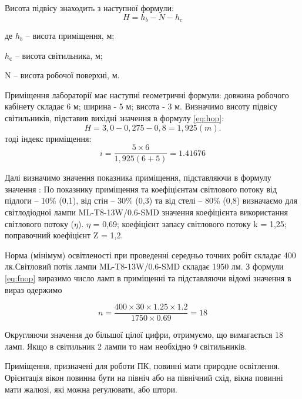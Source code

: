 \documentclass[ukrainian,utf8,simple,floatsubsection, hpadding=5mm,equationsubsection,]{eskdtext}
\begin{document}
Висота підвісу знаходить з наступної формули:
\begin{equation}
\label{eq:hop}
 H =h_{b} - N - h_{c} 
\end{equation}   
\begin{ESKDexplanation}
\item де $h_{b}$ – висота приміщення, м;
\item $h_{с}$ – висота світильника, м;
\item N – висота робочої поверхні, м.
\end{ESKDexplanation}
Приміщення лабораторії має наступні геометричні формули: довжина робочого кабінету складає 6 м;
ширина - 5 м; висота - 3 м. Визначимо висоту підвісу світильників, підставив вихідні значення в формулу \ref{eq:hop}:
\begin{equation}
 H =   3,0 - 0,275 - 0,8 = 1,925(m).
\end{equation}
тоді індекс приміщення:
\begin{equation*}
 i =  \frac{5 \times 6}{1,925(6+5)}= 1.41676
\end{equation*}            

Далі визначимо значення показника приміщення, підставляючи в формулу значення :       
По показнику приміщення та коефіцієнтам світлового потоку від підлоги – 10\% (0,1), від стін – 30\% (0,3) та від стелі – 80\% (0,8)
визначаємо для світлодіодної лампи ML-T8-13W/0.6-SMD значення коефіцієнта використання світлового потоку ($\eta$). $\eta$ = 0,69; коефіцієнт запасу світлового потоку k = 1,25; поправочний коефіцієнт Z = 1,2. 

Норма (мінімум) освітленості при проведенні середньо точних робіт складає 400 лк.Світловий потік лампи ML-T8-13W/0.6-SMD складає 1950 лм. З формули \ref{eq:fnop} виразимо число ламп в приміщенні та підставляючи відомі значення в вираз одержимо
 
\begin{equation}
 n = \frac{400 \times 30 \times 1.25 \times 1.2 }{1750 \times 0.69} = 18
\end{equation}

Округляючи значення до більшої цілої цифри, отримуємо, що вимагається 18 ламп. Якщо в світильник 2 лампи то нам необхідно 9 світильників.

 Приміщення, призначені для роботи ПК, повинні мати природне освітлення. Орієнтація вікон повинна бути на північ або на північний схід, вікна повинні мати жалюзі, які можна регулювати, або штори.

\end{document}
